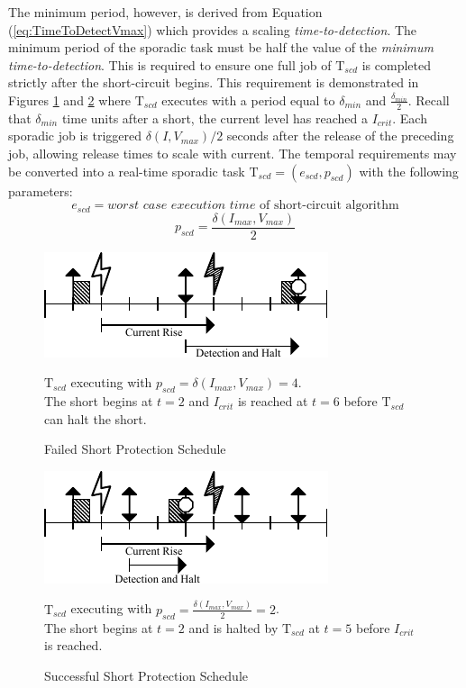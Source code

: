 \documentclass[11pt,oneside]{report}
\begin{document}
    The minimum period, however, is derived from Equation (\ref{eq:TimeToDetectVmax}) which provides a scaling \textit{time-to-detection}. The minimum period of the sporadic task must be half the value of the \textit{minimum time-to-detection}. This is required to ensure one full job of $\mathrm{T}_{scd}$ is completed strictly after the short-circuit begins. This requirement is demonstrated in Figures \ref{fig:shortedschedule} and \ref{fig:stoppedschedule} where $\mathrm{T}_{scd}$ executes with a period equal to $\delta_{min}$ and $\frac{\delta_{min}}{2}$. Recall that $\delta_{min}$ time units after a short, the current level has reached a $I_{crit}$. Each sporadic job is triggered $\delta(I,V_{max})/2$ seconds after the release of the preceding job, allowing release times to scale with current. The temporal requirements may be converted into a real-time sporadic task $\mathrm{T}_{scd} = (e_{scd}, p_{scd})$ with the following parameters:
    \begin{equation}\label{eq:ExecutionTime}
    e_{scd} = \textit{worst case execution time }\text{of short-circuit algorithm}
    \end{equation}
    \begin{equation}\label{eq:Period}
    p_{scd} = \frac{\delta(I_{max},V_{max})}{2}
    \end{equation}
    \begin{figure}
        \centering
        \includegraphics[width=0.60\linewidth]{img/shortedschedule.pdf}
        \caption{Failed Short Protection Schedule} $\mathrm{T}_{scd}$ executing with $p_{scd} = \delta(I_{max},V_{max}) = 4$.\\The short begins at $t = 2$ and $I_{crit}$ is reached at $t = 6$ before $\mathrm{T}_{scd}$ can halt the short.
        \label{fig:shortedschedule}
    \end{figure}
    \begin{figure}
        \centering
        \includegraphics[width=0.60\linewidth]{img/stoppedschedule.pdf}
        \caption{Successful Short Protection Schedule} $\mathrm{T}_{scd}$ executing with $p_{scd} = \frac{\delta(I_{max},V_{max})}{2} = 2$.\\The short begins at $t = 2$ and is halted by $\mathrm{T}_{scd}$ at $t = 5$ before $I_{crit}$ is reached.
        \label{fig:stoppedschedule}
    \end{figure}
\end{document}
